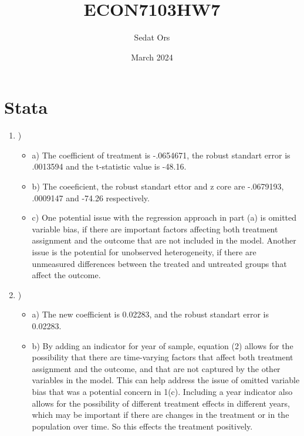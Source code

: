 \documentclass{article}
\title{ECON7103HW7}
\author{Sedat Ors}
\date{March 2024}
\begin{document}
\maketitle

\section{Stata}

\vspace{0.5cm}

\begin{enumerate}

\item )

\begin{itemize}

\item a) The coefficient of treatment is  -.0654671, the robust standart error is .0013594 and the t-statistic value is -48.16. 
\vspace{0.5cm}

\item b) The coeeficient, the robust standart ettor and z core are  -.0679193, .0009147 and  -74.26 respectively.

\vspace{0.5cm}

\item c) One potential issue with the regression approach in part (a) is omitted variable bias, if there are important factors affecting both treatment assignment and the outcome that are not included in the model. Another issue is the potential for unobserved heterogeneity, if there are unmeasured differences between the treated and untreated groups that affect the outcome.

\end {itemize}

\item )
\begin{itemize}

\item a) The new coefficient is 0.02283, and the robust standart error is 0.02283. 

\vspace{0.5cm}

\item b) By adding an indicator for year of sample, equation (2) allows for the possibility that there are time-varying factors that affect both treatment assignment and the outcome, and that are not captured by the other variables in the model. This can help address the issue of omitted variable bias that was a potential concern in 1(c). Including a year indicator also allows for the possibility of different treatment effects in different years, which may be important if there are changes in the treatment or in the population over time. So this effects the treatment positively. 


\end{itemize}
\end{enumerate}
\end{document}
